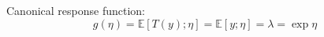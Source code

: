 \begin{answer}
    Canonical response function:
    \begin{equation*}
        g(\eta) = \mathbb{E}\left[T(y);\eta\right] = \mathbb{E}\left[y;\eta\right] = \lambda = \exp\eta
    \end{equation*}
\end{answer}
